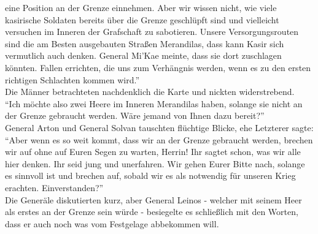 eine Position an der Grenze einnehmen. Aber wir wissen nicht, wie viele kasirische Soldaten bereits 
über die Grenze geschlüpft sind und vielleicht versuchen im Inneren der Grafschaft zu sabotieren. 
Unsere Versorgungsrouten sind die am Besten ausgebauten Straßen Merandilas, dass kann Kasir sich 
vermutlich auch denken. General Mi'Kae meinte, dass sie dort zuschlagen könnten. Fallen errichten, 
die uns zum Verhängnis werden, wenn es zu den ersten richtigen Schlachten kommen wird.''\\
Die Männer betrachteten nachdenklich die Karte und nickten widerstrebend.\\
``Ich möchte also zwei Heere im Inneren Merandilas haben, solange sie nicht an der Grenze gebraucht 
werden. Wäre jemand von Ihnen dazu bereit?''\\
General Arton und General Solvan tauschten flüchtige Blicke, ehe Letzterer sagte: ``Aber wenn es so 
weit kommt, dass wir an der Grenze gebraucht werden, brechen wir auf ohne auf Euren Segen zu 
warten, Herrin! Ihr sagtet schon, was wir alle hier denken. Ihr seid jung und unerfahren. Wir gehen 
Eurer Bitte nach, solange es sinnvoll ist und brechen auf, sobald wir es als notwendig für unseren 
Krieg erachten. Einverstanden?''\\
Die Generäle diskutierten kurz, aber General Leinos - welcher mit seinem Heer als erstes an der 
Grenze sein würde - besiegelte es schließlich mit den Worten, dass er auch noch was vom Festgelage 
abbekommen will.\\



